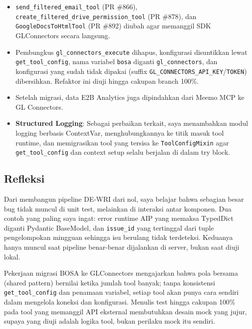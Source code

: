 \begin{itemize}
    \item \texttt{send\_filtered\_email\_tool} (PR \#866), \texttt{create\_filtered\_drive\_permission\_tool} (PR \#878), dan \texttt{GoogleDocsToHtmlTool} (PR \#892) diubah agar memanggil SDK GLConnectors secara langsung.
    \item Pembungkus \texttt{gl\_connectors\_execute} dihapus, konfigurasi disuntikkan lewat \texttt{get\_tool\_config}, nama variabel \texttt{bosa} diganti \texttt{gl\_connectors}, dan konfigurasi yang sudah tidak dipakai (suffix \texttt{GL\_CONNECTORS\_API\_KEY}/\texttt{TOKEN}) dibersihkan. Refaktor ini diuji hingga cakupan branch 100\%.
    \item Setelah migrasi, data E2B Analytics juga dipindahkan dari Meemo MCP ke GL Connectors.
    \item \textbf{Structured Logging}: Sebagai perbaikan terkait, saya menambahkan modul logging berbasis ContextVar, menghubungkannya ke titik masuk tool runtime, dan memigrasikan tool yang tersisa ke \texttt{ToolConfigMixin} agar \texttt{get\_tool\_config} dan context setup selalu berjalan di dalam try block.
\end{itemize}

\subsection{Refleksi}

Dari membangun pipeline DE-WRI dari nol, saya belajar bahwa sebagian besar bug tidak muncul di unit test, melainkan di interaksi antar komponen. Dua contoh yang paling saya ingat: error runtime AIP yang memaksa TypedDict diganti Pydantic BaseModel, dan \texttt{issue\_id} yang tertinggal dari tuple pengelompokan mingguan sehingga isu berulang tidak terdeteksi. Keduanya hanya muncul saat pipeline benar-benar dijalankan di server, bukan saat diuji lokal.

Pekerjaan migrasi BOSA ke GLConnectors mengajarkan bahwa pola bersama (shared pattern) bernilai ketika jumlah tool banyak; tanpa konsistensi \texttt{get\_tool\_config} dan penamaan variabel, setiap tool akan punya cara sendiri dalam mengelola koneksi dan konfigurasi. Menulis test hingga cakupan 100\% pada tool yang memanggil API eksternal membutuhkan desain mock yang jujur, supaya yang diuji adalah logika tool, bukan perilaku mock itu sendiri.

\clearpage
